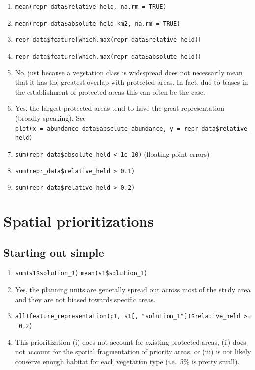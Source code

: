 \documentclass[12pt,]{book}
\providecommand{\tightlist}{%
  \setlength{\itemsep}{0pt}\setlength{\parskip}{0pt}}
\let\BeginKnitrBlock\begin \let\EndKnitrBlock\end
\begin{document}
\BeginKnitrBlock{rmdanswer}
\begin{enumerate}
\def\labelenumi{\arabic{enumi}.}
\tightlist
\item
  \texttt{mean(repr\_data\$relative\_held,\ na.rm\ =\ TRUE)}
\item
  \texttt{mean(repr\_data\$absolute\_held\_km2,\ na.rm\ =\ TRUE)}
\item
  \texttt{repr\_data\$feature{[}which.max(repr\_data\$relative\_held){]}}
\item
  \texttt{repr\_data\$feature{[}which.max(repr\_data\$absolute\_held){]}}
\item
  No, just because a vegetation class is widespread does not necessarily
  mean that it has the greatest overlap with protected areas. In fact,
  due to biases in the establishment of protected areas this can often
  be the case.
\item
  Yes, the largest protected areas tend to have the great representation
  (broadly speaking). \newline
  See
  \texttt{plot(x\ =\ abundance\_data\$absolute\_abundance,\ y\ =\ repr\_data\$relative\_held)}
\item
  \texttt{sum(repr\_data\$absolute\_held\ \textless{}\ 1e-10)} (floating
  point errors)
\item
  \texttt{sum(repr\_data\$relative\_held\ \textgreater{}\ 0.1)}
\item
  \texttt{sum(repr\_data\$relative\_held\ \textgreater{}\ 0.2)}
\end{enumerate}
\EndKnitrBlock{rmdanswer}

\section{Spatial prioritizations}\label{spatial-prioritizations}

\subsection{Starting out simple}\label{starting-out-simple-1}

\BeginKnitrBlock{rmdanswer}
\begin{enumerate}
\def\labelenumi{\arabic{enumi}.}
\tightlist
\item
  \texttt{sum(s1\$solution\_1)} \newline
   \texttt{mean(s1\$solution\_1)}
\item
  Yes, the planning units are generally spread out across most of the
  study area and they are not biased towards specific areas.
\item
  \texttt{all(feature\_representation(p1,\ s1{[},\ "solution\_1"{]})\$relative\_held\ \textgreater{}=\ 0.2)}
\item
  This prioritization (i) does not account for existing protected areas,
  (ii) does not account for the spatial fragmentation of priority areas,
  or (iii) is not likely conserve enough habitat for each vegetation
  type (i.e.~5\% is pretty small).
\end{enumerate}
\EndKnitrBlock{rmdanswer}
\end{document}
